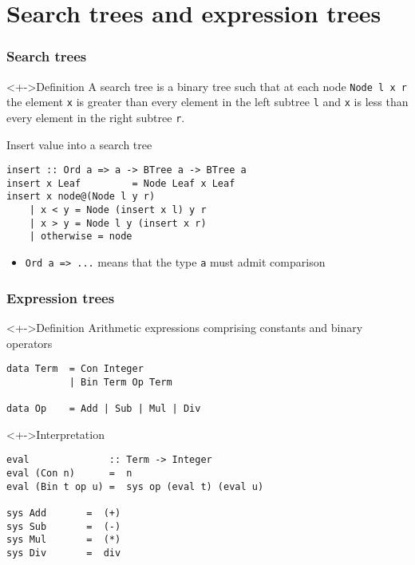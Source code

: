 \documentclass{beamer}
\begin{document}
\section{Search trees and expression trees}
\begin{frame}[fragile]
  \frametitle{Search trees}
  \begin{alertblock}<+->{Definition}
    A \alert{search tree} is a binary tree such that  at each node
    \lstinline{Node l x r} the element \lstinline{x} is greater than every element in the left
    subtree \lstinline{l} and \lstinline{x} is less than every element
    in the right subtree \lstinline{r}.
  \end{alertblock}
  \begin{block}{Insert value into a search tree}
\begin{lstlisting}
insert :: Ord a => a -> BTree a -> BTree a
insert x Leaf         = Node Leaf x Leaf
insert x node@(Node l y r)
    | x < y = Node (insert x l) y r
    | x > y = Node l y (insert x r)
    | otherwise = node
\end{lstlisting}
    \begin{itemize}
    \item \lstinline{Ord a => ...} means that the type \lstinline{a}
      must admit comparison
    \end{itemize}
  \end{block}
\end{frame}
\begin{frame}[fragile]
  \frametitle{Expression trees}
  \begin{block}<+->{Definition}
    Arithmetic expressions comprising constants and binary operators
\begin{lstlisting}
data Term  = Con Integer
           | Bin Term Op Term  
           
data Op    = Add | Sub | Mul | Div
\end{lstlisting}  
  \end{block}
  \begin{block}<+->{Interpretation}
\begin{lstlisting}
eval              :: Term -> Integer
eval (Con n)      =  n
eval (Bin t op u) =  sys op (eval t) (eval u)

sys Add       =  (+)         
sys Sub       =  (-)
sys Mul       =  (*)         
sys Div       =  div
\end{lstlisting}  
  \end{block}
\end{frame}
\end{document}
